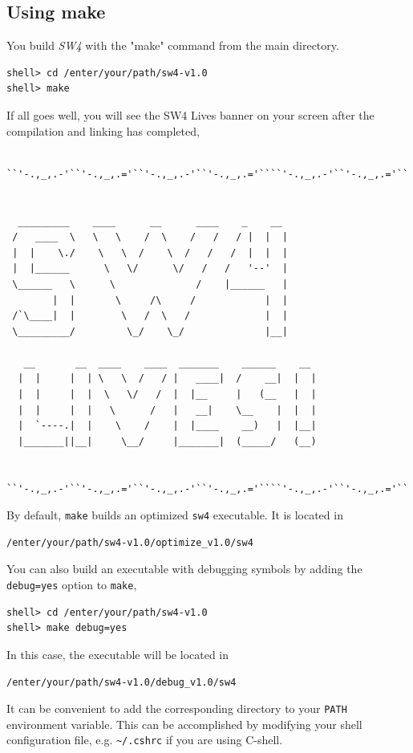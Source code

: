 \documentclass[11pt]{report}
\begin{document}
\subsection{Using make}
You build \emph{SW4} with the "make" command from the main directory.
\begin{verbatim}
shell> cd /enter/your/path/sw4-v1.0
shell> make
\end{verbatim}
If all goes well, you will see the SW4 Lives banner on your screen after the compilation and linking
has completed,
\begin{verbatim}
    
``'-.,_,.-'``'-.,_,.='``'-.,_,.-'``'-.,_,.='````'-.,_,.-'``'-.,_,.='``


  _________    ____      __      ____    _    __
 /   ____  \   \   \    /  \    /   /   / |  |  |  
 |  |    \./    \   \  /    \  /   /   /  |  |  |
 |  |______      \   \/      \/   /   /   '--'  |
 \______   \      \              /    |______   |
        |  |       \     /\     /            |  |      
 /`\____|  |        \   /  \   /             |  |      
 \_________/         \_/    \_/              |__|      
                                       
   __       __  ____    ____  _______    ______    __  
  |  |     |  | \   \  /   / |   ____|  /    __|  |  | 
  |  |     |  |  \   \/   /  |  |__     |   (__   |  | 
  |  |     |  |   \      /   |   __|    \__    |  |  | 
  |  `----.|  |    \    /    |  |____    __)   |  |__| 
  |_______||__|     \__/     |_______|  (_____/   (__)
     

``'-.,_,.-'``'-.,_,.='``'-.,_,.-'``'-.,_,.='````'-.,_,.-'``'-.,_,.='``

\end{verbatim}
By default, \verb+make+ builds an optimized \verb+sw4+ executable. It is located in 
\begin{verbatim}
/enter/your/path/sw4-v1.0/optimize_v1.0/sw4
\end{verbatim}
You can also build an executable with debugging symbols by adding the \verb+debug=yes+ option to \verb+make+,
\begin{verbatim}
shell> cd /enter/your/path/sw4-v1.0
shell> make debug=yes
\end{verbatim}
In this case, the executable will be located in
\begin{verbatim}
/enter/your/path/sw4-v1.0/debug_v1.0/sw4
\end{verbatim}
It can be convenient to add the corresponding directory to your \verb+PATH+ environment
variable. This can be accomplished by modifying your shell configuration file, e.g. \verb+~/.cshrc+
if you are using C-shell.
\end{document}
